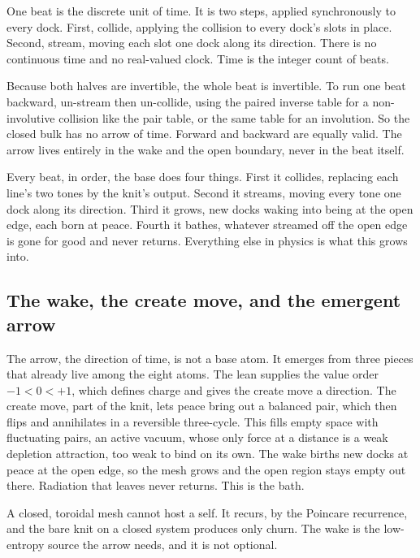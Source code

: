 One beat is the discrete unit of time. It is two steps, applied synchronously to every dock. First, collide, applying the collision to every dock's slots in place. Second, stream, moving each slot one dock along its direction. There is no continuous time and no real-valued clock. Time is the integer count of beats.

Because both halves are invertible, the whole beat is invertible. To run one beat backward, un-stream then un-collide, using the paired inverse table for a non-involutive collision like the pair table, or the same table for an involution. So the closed bulk has no arrow of time. Forward and backward are equally valid. The arrow lives entirely in the wake and the open boundary, never in the beat itself.

\begin{principle}
Every beat, in order, the base does four things. First it collides, replacing each line's two tones by the knit's output. Second it streams, moving every tone one dock along its direction. Third it grows, new docks waking into being at the open edge, each born at peace. Fourth it bathes, whatever streamed off the open edge is gone for good and never returns. Everything else in physics is what this grows into.
\end{principle}

\subsection{The wake, the create move, and the emergent arrow}

The arrow, the direction of time, is not a base atom. It emerges from three pieces that already live among the eight atoms. The lean supplies the value order $-1 < 0 < +1$, which defines charge and gives the create move a direction. The create move, part of the knit, lets peace bring out a balanced pair, which then flips and annihilates in a reversible three-cycle. This fills empty space with fluctuating pairs, an active vacuum, whose only force at a distance is a weak depletion attraction, too weak to bind on its own. The wake births new docks at peace at the open edge, so the mesh grows and the open region stays empty out there. Radiation that leaves never returns. This is the bath.

A closed, toroidal mesh cannot host a self. It recurs, by the Poincare recurrence, and the bare knit on a closed system produces only churn. The wake is the low-entropy source the arrow needs, and it is not optional.

